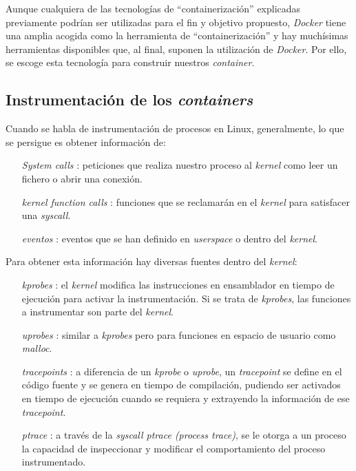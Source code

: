 Aunque cualquiera de las tecnologías de ``containerización'' explicadas previamente podrían ser utilizadas para el fin y objetivo propuesto, \emph{Docker} tiene una amplia acogida como la herramienta de ``containerización''
y hay muchísimas herramientas disponibles que, al final, suponen la utilización de \emph{Docker}. Por ello, se escoge esta tecnología para construir nuestros \emph{container}.

\subsection{Instrumentación de los \emph{containers}}
\label{subsec:instrumentacion-containers}

Cuando se habla de instrumentación de procesos en Linux, generalmente, lo que se persigue es obtener información de:
\begin{enumerate}
    \item[\emph{System calls}]: peticiones que realiza nuestro proceso al \emph{kernel} como leer un fichero o abrir una conexión.
    \item[\emph{kernel function calls}]: funciones que se reclamarán en el \emph{kernel} para satisfacer una \emph{syscall}.
    \item[\emph{eventos}]: eventos que se han definido en \emph{userspace} o dentro del \emph{kernel}.
\end{enumerate}

Para obtener esta información hay diversas fuentes dentro del \emph{kernel}:

\begin{enumerate}
    \item[\emph{kprobes}]: el \emph{kernel} modifica las instrucciones en ensamblador en tiempo de ejecución para activar la instrumentación. Si se trata
    de \emph{kprobes}, las funciones a instrumentar son parte del \emph{kernel}. 
    \item[\emph{uprobes}]: similar a \emph{kprobes} pero para funciones en espacio de usuario como \emph{malloc}.
    \item[\emph{tracepoints}]: a diferencia de un \emph{kprobe} o \emph{uprobe}, un \emph{tracepoint} se define en el código fuente y se genera en tiempo de compilación, pudiendo ser activados en tiempo de ejecución cuando se requiera y extrayendo la información de ese \emph{tracepoint}.
    \item[\emph{ptrace}]: a través de la \emph{syscall ptrace (process trace)}, se le otorga a un proceso la capacidad de inspeccionar y modificar el comportamiento del proceso instrumentado. 
\end{enumerate}

